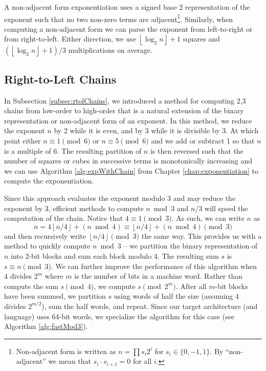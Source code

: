 \documentclass{ucalgthes1}
\theoremstyle{definition}
\newcommand{\floor}[1]{\left\lfloor #1 \right\rfloor}
\begin{document}
A non-adjacent form exponentiation uses a signed base 2 representation of the exponent such that no two non-zero terms are adjacent\footnote{Non-adjacent form is written as $n=\prod s_i2^i$ for $s_i \in \{0, -1, 1\}$. By ``non-adjacent'' we mean that $s_i \cdot s_{i+1} = 0$ for all $i$.}.  Similarly, when computing a non-adjacent form we can parse the exponent from left-to-right or from right-to-left.  Either direction, we use $\floor{\log_2n} + 1$ squares and $(\floor{\log_2n}+1)/3$ multiplications on average.   

\subsection{Right-to-Left Chains}
In Subsection \ref{subsec:rtolChains}, we introduced a method for computing 2,3 chains from low-order to high-order that is a natural extension of the binary representation or non-adjacent form of an exponent.  In this method, we reduce the exponent $n$ by 2 while it is even, and by 3 while it is divisible by 3.  At which point either $n \equiv 1 \pmod 6$ or $n \equiv 5 \pmod 6$ and we add or subtract 1 so that $n$ is a multiple of 6.  The resulting partition of $n$ is then reversed such that the number of squares or cubes in successive terms is monotonically increasing and we can use Algorithm \ref{alg:expWithChain} from Chapter \ref{chap:exponentiation} to compute the exponentiation.

Since this approach evaluates the exponent modulo 3 and may reduce the exponent by 3, efficient methods to compute $n \bmod 3$ and $n/3$ will speed the computation of the chain. Notice that $4 \equiv 1 \pmod 3$.  As such, we can write $n$ as
\[
n = 4 \floor{n/4} + (n \bmod 4) \equiv \floor{n/4} + (n \bmod 4) \pmod 3
\]
and then recursively write $\floor{n/4} \pmod 3$ the same way. This provides us with a method to quickly compute $n \bmod 3$ -- we partition the binary representation of $n$ into \mbox{2-bit} blocks and sum each block modulo 4.  The resulting sum $s$ is $s \equiv n \pmod 3$.  We can further improve the performance of this algorithm when $4$ divides $2^m$ where $m$ is the number of bits in a machine word.  Rather than compute the sum $s \pmod 4$, we compute \mbox{$s \pmod{2^m}$}. After all $m$-bit blocks have been summed, we partition $s$ using words of half the size (assuming 4 divides $2^{m/2}$), sum the half words, and repeat. Since our target architecture (and language) uses 64-bit words, we specialize the algorithm for this case (see Algorithm \ref{alg:fastMod3}).
\end{document}
